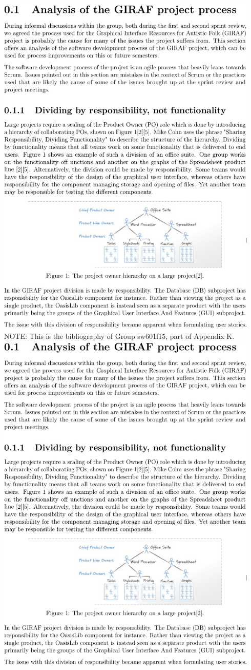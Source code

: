 \includegraphics[page=6,width=0.94\textwidth]{part_appendix/sw601f15.pdf}\clearpage{}
\noindent\textsf{NOTE:} This is the bibliography of Group sw601f15, part of Appendix K\@.\\
\includegraphics[page=7,width=0.94\textwidth]{part_appendix/sw601f15.pdf}